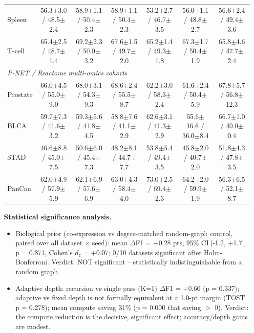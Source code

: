 \documentclass[landscape]{article}
\begin{document}
{\begin{tabular}{lcccccc}
Spleen & 56.3$\pm$3.0 / 48.5$\pm$2.4 & 58.9$\pm$1.1 / 50.4$\pm$2.3 & 58.9$\pm$1.1 / 50.4$\pm$2.3 & 53.2$\pm$2.7 / 46.7$\pm$3.5 & 56.0$\pm$1.1 / 48.8$\pm$2.7 & 56.6$\pm$2.4 / 49.4$\pm$3.6 \\
T-cell & 65.4$\pm$2.5 / 48.7$\pm$1.4 & 69.2$\pm$2.3 / 50.0$\pm$3.2 & 67.6$\pm$1.5 / 49.7$\pm$2.0 & 65.2$\pm$1.4 / 49.3$\pm$1.8 & 67.3$\pm$1.7 / 50.4$\pm$1.9 & 65.8$\pm$4.6 / 47.7$\pm$2.4 \\
\midrule
\multicolumn{7}{l}{\textit{P-NET / Reactome multi-omics cohorts}}\\
\midrule
Prostate & 66.0$\pm$4.5 / 55.0$\pm$9.0 & 68.0$\pm$3.1 / 54.3$\pm$9.3 & 68.6$\pm$2.4 / 55.5$\pm$8.7 & 62.2$\pm$3.0 / 58.3$\pm$2.4 & 61.6$\pm$2.4 / 50.4$\pm$5.9 & 67.8$\pm$5.7 / 56.8$\pm$12.3 \\
BLCA & 59.7$\pm$7.3 / 41.6$\pm$3.2 & 59.3$\pm$5.6 / 41.8$\pm$4.5 & 58.8$\pm$7.6 / 41.1$\pm$2.9 & 62.6$\pm$3.1 / 41.3$\pm$2.9 & 55.6$\pm$16.6 / 36.0$\pm$8.4 & 66.7$\pm$1.0 / 40.0$\pm$0.4 \\
STAD & 46.6$\pm$8.8 / 45.0$\pm$7.5 & 50.6$\pm$6.0 / 45.4$\pm$7.3 & 48.2$\pm$8.1 / 44.7$\pm$7.7 & 53.8$\pm$5.4 / 49.4$\pm$3.5 & 45.8$\pm$2.0 / 40.7$\pm$2.0 & 51.8$\pm$4.3 / 47.8$\pm$3.5 \\
PanCan & 62.0$\pm$4.9 / 57.9$\pm$5.9 & 62.1$\pm$6.9 / 57.6$\pm$6.9 & 63.0$\pm$4.3 / 58.4$\pm$4.0 & 73.0$\pm$2.5 / 69.4$\pm$2.3 & 64.2$\pm$2.0 / 59.9$\pm$1.9 & 56.3$\pm$6.5 / 52.1$\pm$8.7 \\
\bottomrule
\end{tabular}}
\vspace{8pt}

\noindent\textbf{Statistical significance analysis.}
\begin{itemize}\setlength{\itemsep}{1pt}\footnotesize
\item Biological prior (co-expression vs degree-matched random-graph control, paired over all dataset $\times$ seed): mean $\Delta$F1 = +0.28 pts, 95\% CI [-1.2, +1.7], p = 0.871, Cohen's $d_z$ = +0.07; 0/10 datasets significant after Holm-Bonferroni. Verdict: NOT significant -- statistically indistinguishable from a random graph.
\item Adaptive depth: recursion vs single pass (K=1) $\Delta$F1 = +0.60 (p = 0.337); adaptive vs fixed depth is not formally equivalent at a 1.0-pt margin (TOST p = 0.278); mean compute saving 31\% (p = 0.000 that saving $>$ 0). Verdict: the compute reduction is the decisive, significant effect; accuracy/depth gains are modest.
\end{itemize}
\end{document}
